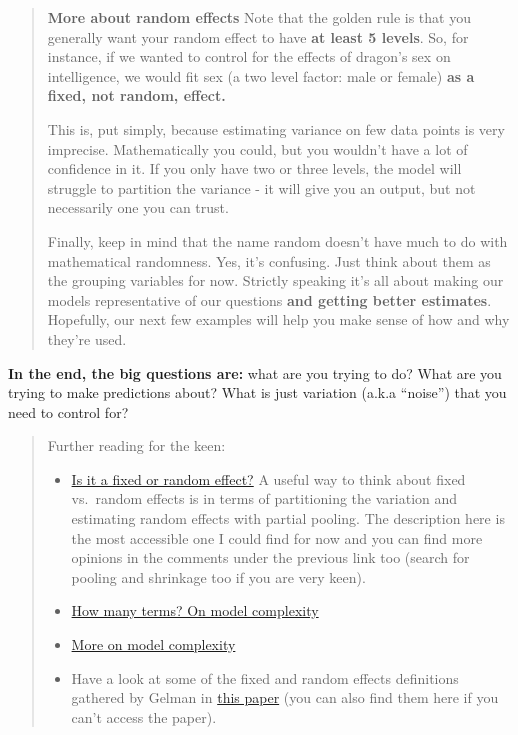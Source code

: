 \documentclass[
]{article}
\providecommand{\tightlist}{%
  \setlength{\itemsep}{0pt}\setlength{\parskip}{0pt}}
\begin{document}
\begin{quote}
\textbf{More about random effects} Note that the golden rule is that you
generally want your random effect to have \textbf{at least 5 levels}.
So, for instance, if we wanted to control for the effects of dragon's
sex on intelligence, we would fit sex (a two level factor: male or
female) \textbf{as a fixed, not random, effect.}

This is, put simply, because estimating variance on few data points is
very imprecise. Mathematically you could, but you wouldn't have a lot of
confidence in it. If you only have two or three levels, the model will
struggle to partition the variance - it will give you an output, but not
necessarily one you can trust.

Finally, keep in mind that the name random doesn't have much to do with
mathematical randomness. Yes, it's confusing. Just think about them as
the grouping variables for now. Strictly speaking it's all about making
our models representative of our questions \textbf{and getting better
estimates}. Hopefully, our next few examples will help you make sense of
how and why they're used.
\end{quote}

\textbf{In the end, the big questions are:} what are you trying to do?
What are you trying to make predictions about? What is just variation
(a.k.a ``noise'') that you need to control for?

\begin{quote}
Further reading for the keen:

\begin{itemize}
\tightlist
\item
  \href{https://dynamicecology.wordpress.com/2015/11/04/is-it-a-fixed-or-random-effect/}{Is
  it a fixed or random effect?} A useful way to think about fixed
  vs.~random effects is in terms of partitioning the variation and
  estimating random effects with partial pooling. The description here
  is the most accessible one I could find for now and you can find more
  opinions in the comments under the previous link too (search for
  pooling and shrinkage too if you are very keen).
\item
  \href{https://dynamicecology.wordpress.com/2015/02/05/how-many-terms-in-your-model-before-statistical-machismo/}{How
  many terms? On model complexity}
\item
  \href{https://dynamicecology.wordpress.com/2014/12/02/why-are-your-statistical-models-more-complex-these-days/}{More
  on model complexity}
\item
  Have a look at some of the fixed and random effects definitions
  gathered by Gelman in
  \href{https://sites.stat.columbia.edu/gelman/research/published/AOS259.pdf}{this
  paper} (you can also find them here if you can't access the paper).
\end{itemize}
\end{quote}
\end{document}
